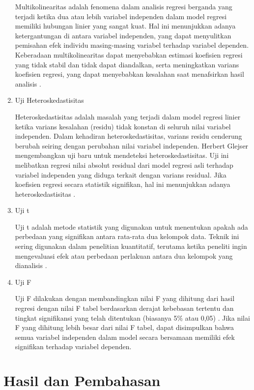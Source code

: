 \begin{enumerate}
        Multikolinearitas adalah fenomena dalam analisis regresi berganda yang terjadi ketika dua atau lebih variabel independen dalam model regresi memiliki hubungan linier yang sangat kuat. Hal ini menunjukkan adanya ketergantungan di antara variabel independen, yang dapat menyulitkan pemisahan efek individu masing-masing variabel terhadap variabel dependen. Keberadaan multikolinearitas dapat menyebabkan estimasi koefisien regresi yang tidak stabil dan tidak dapat diandalkan, serta meningkatkan varians koefisien regresi, yang dapat menyebabkan kesalahan saat menafsirkan hasil analisis \citep{Khatun2021}.

        \item Uji Heteroskedastisitas

        Heteroskedastisitas adalah masalah yang terjadi dalam model regresi linier ketika varians kesalahan (residu) tidak konstan di seluruh nilai variabel independen. Dalam kehadiran heteroskedastisitas, varians residu cenderung berubah seiring dengan perubahan nilai variabel independen. Herbert Glejser mengembangkan uji baru untuk mendeteksi heteroskedastisitas. Uji ini melibatkan regresi nilai absolut residual dari model regresi asli terhadap variabel independen yang diduga terkait dengan varians residual. Jika koefisien regresi secara statistik signifikan, hal ini menunjukkan adanya heteroskedastisitas \citep{Kim2019}.

        \item Uji t

        Uji t adalah metode statistik yang digunakan untuk menentukan apakah ada perbedaan yang signifikan antara rata-rata dua kelompok data. Teknik ini sering digunakan dalam penelitian kuantitatif, terutama ketika peneliti ingin mengevaluasi efek atau perbedaan perlakuan antara dua kelompok yang dianalisis \citep{Glejser1969}.

        \item Uji F

        Uji F dilakukan dengan membandingkan nilai F yang dihitung dari hasil regresi dengan nilai F tabel berdasarkan derajat kebebasan tertentu dan tingkat signifikansi yang telah ditentukan (biasanya 5\% atau 0,05) \citep{Bhuyean2025}. Jika nilai F yang dihitung lebih besar dari nilai F tabel, dapat disimpulkan bahwa semua variabel independen dalam model secara bersamaan memiliki efek signifikan terhadap variabel dependen.
    \end{enumerate}

\section{Hasil dan Pembahasan}

